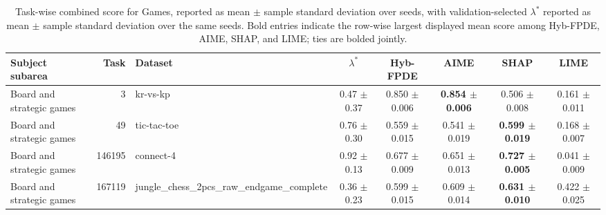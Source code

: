 \begin{table}[!tbp]
    \caption{Task-wise combined score for Games, reported as mean $\pm$ sample standard deviation over seeds, with validation-selected $\lambda^*$ reported as mean $\pm$ sample standard deviation over the same seeds. Bold entries indicate the row-wise largest displayed mean score among Hyb-FPDE, AIME, SHAP, and LIME; ties are bolded jointly.}
    \label{tab:taskwise_combined_scores_sd_games}
    \centering
    \scriptsize
    \setlength{\tabcolsep}{3pt}
    \renewcommand{\arraystretch}{1.03}
    \begin{tabular}{lrlccccc}
        \toprule
        Subject subarea & Task & Dataset & $\lambda^*$ & Hyb-FPDE & AIME & SHAP & LIME  \\
        \midrule
        Board and strategic games & 3 & kr-vs-kp & 0.47 $\pm$ 0.37 & 0.850 $\pm$ 0.006 & \textbf{0.854 $\pm$ 0.006} & 0.506 $\pm$ 0.008 & 0.161 $\pm$ 0.011 \\
        Board and strategic games & 49 & tic-tac-toe & 0.76 $\pm$ 0.30 & 0.559 $\pm$ 0.015 & 0.541 $\pm$ 0.019 & \textbf{0.599 $\pm$ 0.019} & 0.168 $\pm$ 0.007 \\
        Board and strategic games & 146195 & connect-4 & 0.92 $\pm$ 0.13 & 0.677 $\pm$ 0.009 & 0.651 $\pm$ 0.013 & \textbf{0.727 $\pm$ 0.005} & 0.041 $\pm$ 0.009 \\
        Board and strategic games & 167119 & jungle\_chess\_2pcs\_raw\_endgame\_complete & 0.36 $\pm$ 0.23 & 0.599 $\pm$ 0.015 & 0.609 $\pm$ 0.014 & \textbf{0.631 $\pm$ 0.010} & 0.422 $\pm$ 0.025 \\
        \bottomrule
    \end{tabular}%
\end{table}

